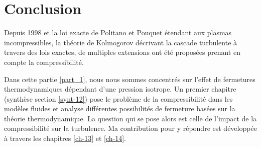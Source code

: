 \chapter*{Conclusion}
 \adjustmtc
\renewcommand\partie{\Partie\ CONCLUSION}
\label{ch-15}

	

Depuis 1998 et la loi exacte de {\sc Politano} et {\sc Pouquet} étendant aux plasmas incompressibles, la théorie de Kolmogorov décrivant la cascade turbulente à travers des lois exactes, de multiples extensions ont été proposées prenant en compte la compressibilité. 

Dans cette partie \ref{part_1}, nous nous sommes concentrés sur l'effet de fermetures thermodynamiques dépendant d'une pression isotrope. Un premier chapitre (synthèse section \ref{synt-12}) pose le problème de la compressibilité dans les modèles fluides et analyse différentes possibilités de fermeture basées sur la théorie thermodynamique. La question qui se pose alors est celle de l'impact de la compressibilité sur la turbulence. Ma contribution pour y répondre est développée à travers les chapitres \ref{ch-13} et \ref{ch-14}. 


